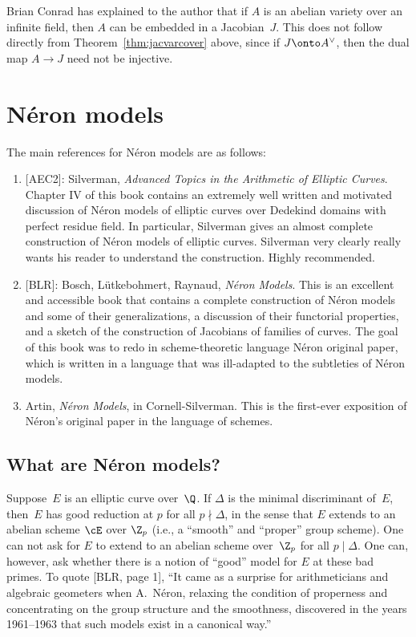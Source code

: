 \documentclass{report}
\begin{document}
\begin{remark}
Brian Conrad has explained to the author that if $A$ is an abelian
variety over an infinite field, then $A$ can be embedded in a
Jacobian~$J$.  This does not follow directly from
Theorem~\ref{thm:jacvarcover} above, since if $J\onto A^{\vee}$,
then the dual map $A\to J$ need not be injective.
\end{remark}

\section{N\'eron models}

The main references for N\'eron models are as follows:
\begin{enumerate}
\item {[AEC2]}: Silverman, {\em Advanced Topics in the Arithmetic
of Elliptic Curves}.  Chapter IV of this book contains an
extremely well written and motivated discussion of N\'eron models
of elliptic curves over Dedekind domains with perfect residue
field. In particular, Silverman gives an almost complete
construction of N\'eron models of elliptic curves.  Silverman very
clearly really
wants his reader to understand the construction.  Highly recommended.%
\item {[BLR]}: Bosch, L\"utkebohmert, Raynaud, {\em N\'eron
Models}. This is an excellent and accessible book that contains a
complete construction of N\'eron models and some of their
generalizations, a discussion of their functorial properties, and
a sketch of the construction of Jacobians of families of curves.
The goal of this book was to redo in scheme-theoretic language
N\'eron original paper, which is written in a language that was
ill-adapted to the
subtleties of N\'eron models.%
\item Artin, {\em N\'eron Models}, in Cornell-Silverman. This is
the first-ever exposition of N\'eron's original paper in the
language of schemes.
\end{enumerate}


\subsection{What are N\'eron models?}
Suppose~$E$ is an elliptic curve over~$\Q$.  If $\Delta$ is the
minimal discriminant of~$E$, then~$E$ has good reduction at $p$
for all $p\nmid \Delta$, in the sense that $E$ extends to an
abelian scheme $\cE$ over $\Z_p$ (i.e., a ``smooth'' and
``proper'' group scheme).  One can not ask for $E$ to extend to an
abelian scheme over~$\Z_p$ for all $p\mid \Delta$.  One can,
however, ask whether there is a notion of ``good'' model for $E$
at these bad primes.  To quote [BLR, page 1], ``It came as a
surprise for arithmeticians and algebraic geometers when
A.~N\'eron, relaxing the condition of properness and concentrating
on the group structure and the smoothness, discovered in the years
1961--1963 that such models exist in a canonical way.''
\end{document}
